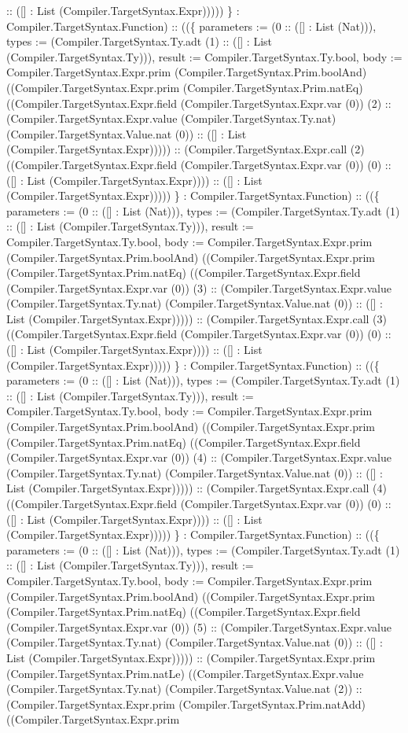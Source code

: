 \documentclass[11pt]{article}
\begin{document}
:: ([] : List (Compiler.TargetSyntax.Expr))))) \} : Compiler.TargetSyntax.Function) :: ((\{ parameters := (0 :: ([] : List (Nat))), types := (Compiler.TargetSyntax.Ty.adt (1) :: ([] : List (Compiler.TargetSyntax.Ty))), result := Compiler.TargetSyntax.Ty.bool, body := Compiler.TargetSyntax.Expr.prim (Compiler.TargetSyntax.Prim.boolAnd) ((Compiler.TargetSyntax.Expr.prim (Compiler.TargetSyntax.Prim.natEq) ((Compiler.TargetSyntax.Expr.field (Compiler.TargetSyntax.Expr.var (0)) (2) :: (Compiler.TargetSyntax.Expr.value (Compiler.TargetSyntax.Ty.nat) (Compiler.TargetSyntax.Value.nat (0)) :: ([] : List (Compiler.TargetSyntax.Expr))))) :: (Compiler.TargetSyntax.Expr.call (2) ((Compiler.TargetSyntax.Expr.field (Compiler.TargetSyntax.Expr.var (0)) (0) :: ([] : List (Compiler.TargetSyntax.Expr)))) :: ([] : List (Compiler.TargetSyntax.Expr))))) \} : Compiler.TargetSyntax.Function) :: ((\{ parameters := (0 :: ([] : List (Nat))), types := (Compiler.TargetSyntax.Ty.adt (1) :: ([] : List (Compiler.TargetSyntax.Ty))), result := Compiler.TargetSyntax.Ty.bool, body := Compiler.TargetSyntax.Expr.prim (Compiler.TargetSyntax.Prim.boolAnd) ((Compiler.TargetSyntax.Expr.prim (Compiler.TargetSyntax.Prim.natEq) ((Compiler.TargetSyntax.Expr.field (Compiler.TargetSyntax.Expr.var (0)) (3) :: (Compiler.TargetSyntax.Expr.value (Compiler.TargetSyntax.Ty.nat) (Compiler.TargetSyntax.Value.nat (0)) :: ([] : List (Compiler.TargetSyntax.Expr))))) :: (Compiler.TargetSyntax.Expr.call (3) ((Compiler.TargetSyntax.Expr.field (Compiler.TargetSyntax.Expr.var (0)) (0) :: ([] : List (Compiler.TargetSyntax.Expr)))) :: ([] : List (Compiler.TargetSyntax.Expr))))) \} : Compiler.TargetSyntax.Function) :: ((\{ parameters := (0 :: ([] : List (Nat))), types := (Compiler.TargetSyntax.Ty.adt (1) :: ([] : List (Compiler.TargetSyntax.Ty))), result := Compiler.TargetSyntax.Ty.bool, body := Compiler.TargetSyntax.Expr.prim (Compiler.TargetSyntax.Prim.boolAnd) ((Compiler.TargetSyntax.Expr.prim (Compiler.TargetSyntax.Prim.natEq) ((Compiler.TargetSyntax.Expr.field (Compiler.TargetSyntax.Expr.var (0)) (4) :: (Compiler.TargetSyntax.Expr.value (Compiler.TargetSyntax.Ty.nat) (Compiler.TargetSyntax.Value.nat (0)) :: ([] : List (Compiler.TargetSyntax.Expr))))) :: (Compiler.TargetSyntax.Expr.call (4) ((Compiler.TargetSyntax.Expr.field (Compiler.TargetSyntax.Expr.var (0)) (0) :: ([] : List (Compiler.TargetSyntax.Expr)))) :: ([] : List (Compiler.TargetSyntax.Expr))))) \} : Compiler.TargetSyntax.Function) :: ((\{ parameters := (0 :: ([] : List (Nat))), types := (Compiler.TargetSyntax.Ty.adt (1) :: ([] : List (Compiler.TargetSyntax.Ty))), result := Compiler.TargetSyntax.Ty.bool, body := Compiler.TargetSyntax.Expr.prim (Compiler.TargetSyntax.Prim.boolAnd) ((Compiler.TargetSyntax.Expr.prim (Compiler.TargetSyntax.Prim.natEq) ((Compiler.TargetSyntax.Expr.field (Compiler.TargetSyntax.Expr.var (0)) (5) :: (Compiler.TargetSyntax.Expr.value (Compiler.TargetSyntax.Ty.nat) (Compiler.TargetSyntax.Value.nat (0)) :: ([] : List (Compiler.TargetSyntax.Expr))))) :: (Compiler.TargetSyntax.Expr.prim (Compiler.TargetSyntax.Prim.natLe) ((Compiler.TargetSyntax.Expr.value (Compiler.TargetSyntax.Ty.nat) (Compiler.TargetSyntax.Value.nat (2)) :: (Compiler.TargetSyntax.Expr.prim (Compiler.TargetSyntax.Prim.natAdd) ((Compiler.TargetSyntax.Expr.prim 
\end{document}
